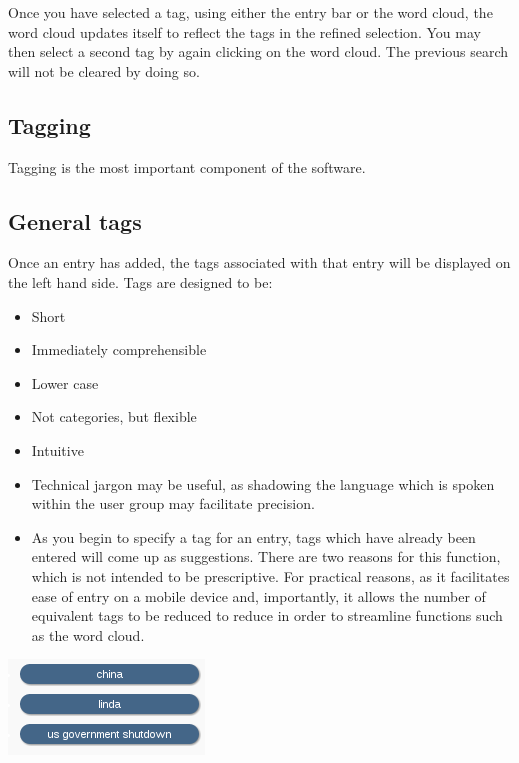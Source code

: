 \documentclass[letterpaper,10pt,english]{sphinxmanual}
\begin{document}
Once you have selected a tag, using either the entry bar or the word
cloud, the word cloud updates itself to reflect the tags in the refined
selection. You may then select a second tag by again clicking on the
word cloud. The previous search will not be cleared by doing so.


\subsection{Tagging}
\label{user-guide:tagging}
Tagging is the most important component of the software.


\subsection{General tags}
\label{user-guide:general-tags}
Once an entry has added, the tags associated with that entry will be
displayed on the left hand side. Tags are designed to be:
\begin{itemize}
\item {} 
Short

\item {} 
Immediately comprehensible

\item {} 
Lower case

\item {} 
Not categories, but flexible

\item {} 
Intuitive

\item {} 
Technical jargon may be useful, as shadowing the language which is spoken within the user group may facilitate precision.

\item {} 
As you begin to specify a tag for an entry, tags which have already been entered will come up as suggestions. There are two reasons for this function, which is not intended to be prescriptive. For practical reasons, as it facilitates ease of entry on a mobile device and, importantly, it allows the number of equivalent tags to be reduced to reduce in order to streamline functions such as the word cloud.

\end{itemize}

{\hfill\includegraphics{candy-basket-generaltags.png}\hfill}
\end{document}
